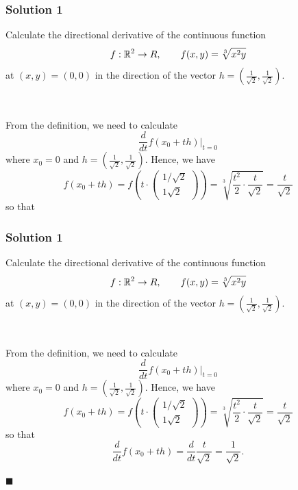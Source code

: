 \documentclass[10pt, t, allowdisplaybreaks]{beamer}
\newcommand{\myqed}{\hfill$\blacksquare$}
\newcommand{\nullspacesmall}{~\vspace{1em}}
\newcommand{\at}[3]{\left.#1\right\vert_{#2}^{#3}}
\begin{document}
\begin{frame}[allowframebreaks]
    \frametitle{Solution 1}
    \par Calculate the directional derivative of the continuous function
    \begin{equation*}
        f:\mathbb{R}^2\rightarrow R, \qquad f(x,y) = \sqrt[3]{x^2y}
    \end{equation*}
    at $(x,y) = (0,0)$ in the direction of the vector $h = (\frac{1}{\sqrt{2}}, \frac{1}{\sqrt{2}})$.

    \nullspacesmall

    \par From the definition, we need to calculate
    \begin{equation*}
        \frac{d}{dt} \at{f(x_0 + th)}{t = 0}{}
    \end{equation*}
    where $x_0 = 0$ and $h = (\frac{1}{\sqrt{2}}, \frac{1}{\sqrt{2}})$. Hence, we have 
    \begin{equation*}
        f(x_0 + th) = f(t\cdot \begin{pmatrix}
            1/\sqrt{2}\\
            1\sqrt{2}
        \end{pmatrix}) = \sqrt[3]{\frac{t^2}{2}\cdot \frac{t}{\sqrt{2}}} = \frac{t}{\sqrt{2}}
    \end{equation*}
    so that 

\end{frame}

\begin{frame}
    \frametitle{Solution 1}
    \par Calculate the directional derivative of the continuous function
    \begin{equation*}
        f:\mathbb{R}^2\rightarrow R, \qquad f(x,y) = \sqrt[3]{x^2y}
    \end{equation*}
    at $(x,y) = (0,0)$ in the direction of the vector $h = (\frac{1}{\sqrt{2}}, \frac{1}{\sqrt{2}})$.

    \nullspacesmall

    \par From the definition, we need to calculate
    \begin{equation*}
        \frac{d}{dt} \at{f(x_0 + th)}{t = 0}{}
    \end{equation*}
    where $x_0 = 0$ and $h = (\frac{1}{\sqrt{2}}, \frac{1}{\sqrt{2}})$. Hence, we have 
    \begin{equation*}
        f(x_0 + th) = f(t\cdot \begin{pmatrix}
            1/\sqrt{2}\\
            1\sqrt{2}
        \end{pmatrix}) = \sqrt[3]{\frac{t^2}{2}\cdot \frac{t}{\sqrt{2}}} = \frac{t}{\sqrt{2}}
    \end{equation*}
    so that 
    \begin{equation*}
        \frac{d}{dt}f(x_0 + th) = \frac{d}{dt}\frac{t}{\sqrt{2}} = \frac{1}{\sqrt{2}}.
    \end{equation*}
    
    \myqed

\end{frame}
\end{document}
